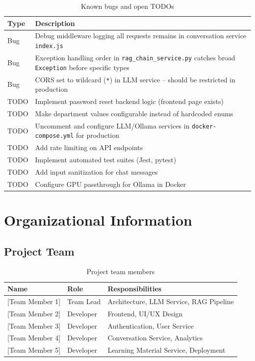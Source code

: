 \documentclass[a4paper,12pt]{report}
\begin{document}
\begin{table}[H]
\centering
\begin{tabularx}{\textwidth}{lX}
    \toprule
    \textbf{Type} & \textbf{Description} \\
    \midrule
    Bug & Debug middleware logging all requests remains in conversation service \texttt{index.js} \\
    Bug & Exception handling order in \texttt{rag\_chain\_service.py} catches broad \texttt{Exception} before specific types \\
    Bug & CORS set to wildcard (\texttt{*}) in LLM service -- should be restricted in production \\
    TODO & Implement password reset backend logic (frontend page exists) \\
    TODO & Make department values configurable instead of hardcoded enums \\
    TODO & Uncomment and configure LLM/Ollama services in \texttt{docker-compose.yml} for production \\
    TODO & Add rate limiting on API endpoints \\
    TODO & Implement automated test suites (Jest, pytest) \\
    TODO & Add input sanitization for chat messages \\
    TODO & Configure GPU passthrough for Ollama in Docker \\
    \bottomrule
\end{tabularx}
\caption{Known bugs and open TODOs}
\end{table}


\chapter{Organizational Information}

\section{Project Team}

\begin{table}[H]
\centering
\begin{tabularx}{\textwidth}{llX}
    \toprule
    \textbf{Name} & \textbf{Role} & \textbf{Responsibilities} \\
    \midrule
    {[Team Member 1]} & Team Lead & Architecture, LLM Service, RAG Pipeline \\
    {[Team Member 2]} & Developer & Frontend, UI/UX Design \\
    {[Team Member 3]} & Developer & Authentication, User Service \\
    {[Team Member 4]} & Developer & Conversation Service, Analytics \\
    {[Team Member 5]} & Developer & Learning Material Service, Deployment \\
    \bottomrule
\end{tabularx}
\caption{Project team members}
\label{tab:team}
\end{table}
\end{document}
